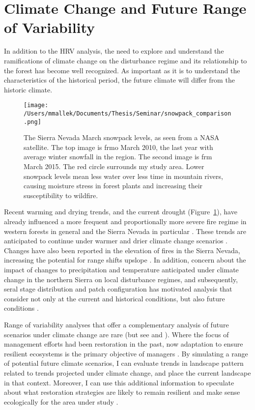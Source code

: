 



\section{Climate Change and Future Range of Variability}

In addition to the HRV analysis, the need to explore and understand the ramifications of climate change on the disturbance regime and its relationship to the forest has become well recognized. As important as it is to understand the characteristics of the historical period, the future climate will differ from the historic climate. 
%
\begin{figure}[!htbp]
\centering
\texttt{[image: /Users/mmallek/Documents/Thesis/Seminar/snowpack\_comparison.png]}
\caption{The Sierra Nevada March snowpack levels, as seen from a NASA satellite. The top image is frmo March 2010, the last year with average winter snowfall in the region. The second image is frm March 2015. The red circle surrounds my study area. Lower snowpack levels mean less water over less time in mountain rivers, causing moisture stress in forest plants and increasing their susceptibility to wildfire.
}
\label{fig:satellitesnowpack}
\end{figure}

Recent warming and drying trends, and the current drought (Figure~\ref{fig:satellitesnowpack}), have already influenced a more frequent and proportionally more severe fire regime in western forests in general and the Sierra Nevada in particular \citep{McKenzie2004,Westerling2011,Miller2012}. These trends are anticipated to continue under warmer and drier climate change scenarios \citep{Westerling2008}.  Changes have also been reported in the elevation of fires in the Sierra Nevada, increasing the potential for range shifts upslope \citep{Schwartz2015}. In addition, concern about the impact of changes to precipitation and temperature anticipated under climate change in the northern Sierra on local disturbance regimes, and subsequently, seral stage distribution and patch configuration has motivated analysis that consider not only at the current and historical conditions, but also future conditions \citep{Fule2008,North2012}. 

Range of variability analyses that offer a complementary analysis of future scenarios under climate change are rare (but see \cite{Keane2008} and \cite{Duveneck2014}). Where the focus of management efforts had been restoration in the past, now adaptation to ensure resilient ecosystems is the primary objective of managers \citep{Stephens2010}. By simulating a range of potential future climate scenarios, I can evaluate trends in landscape pattern related to trends projected under climate change, and place the current landscape in that context. Moreover, I can use this additional information to speculate about what restoration strategies are likely to remain resilient and make sense ecologically for the area under study \citep{Duncan2010}. 

